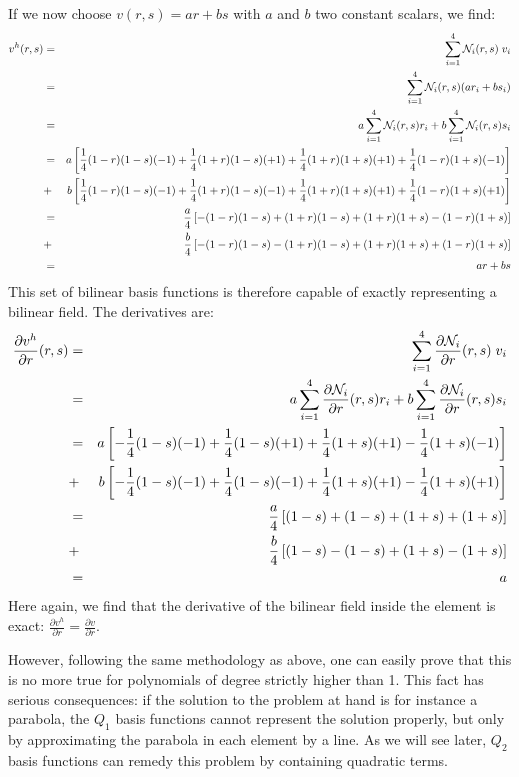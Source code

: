 If we now choose $v(r,s)=ar+bs$ with $a$ and $b$ two constant scalars, we find:
\begin{eqnarray}
v^h(r,s) 
&=& \sum_{i=1}^4 {\mathcal{N}}_i(r,s)\;  v_i  \nonumber\\
&=& \sum_{i=1}^4 {\mathcal{N}}_i(r,s) (ar_i+bs_i) \nonumber\\
&=& a \sum_{i=1}^4 {\mathcal{N}}_i(r,s) r_i + b \sum_{i=1}^4 {\mathcal{N}}_i(r,s) s_i \nonumber\\
&=& a \left[ 
 \frac14(1-r)(1-s)(-1)
+\frac14(1+r)(1-s)(+1)
+\frac14(1+r)(1+s)(+1)
+\frac14(1-r)(1+s)(-1) \right]  \nonumber\\
&+& b  
\left[ 
 \frac14(1-r)(1-s)(-1)
+\frac14(1+r)(1-s)(-1)
+\frac14(1+r)(1+s)(+1)
+\frac14(1-r)(1+s)(+1) \right]  \nonumber\\
&=& \frac{a}{4} \left[ 
-(1-r)(1-s)
+(1+r)(1-s)
+(1+r)(1+s)
-(1-r)(1+s) \right]  \nonumber\\
&+& \frac{b}{4}
\left[ 
-(1-r)(1-s)
-(1+r)(1-s)
+(1+r)(1+s)
+(1-r)(1+s) 
\right]  \nonumber\\
&=& ar+bs
\end{eqnarray}
This set of bilinear basis functions is therefore capable of exactly representing a bilinear field.
The derivatives are:
\begin{eqnarray}
\frac{\partial v^h}{\partial r}(r,s) 
&=& \sum_{i=1}^4 \frac{\partial {\mathcal{N}}_i}{\partial r}(r,s)\;  v_i  \nonumber\\
&=& a \sum_{i=1}^4 \frac{\partial {\mathcal{N}}_i}{\partial r}(r,s) r_i 
+ b \sum_{i=1}^4 \frac{\partial {\mathcal{N}}_i}{\partial r}(r,s) s_i \nonumber\\
&=& a \left[
- \frac14(1-s)(-1) 
+ \frac14(1-s)(+1) 
+ \frac14(1+s)(+1) 
- \frac14(1+s)(-1) 
\right] \nonumber\\
&+&b \left[
- \frac14(1-s)(-1) 
+ \frac14(1-s)(-1) 
+ \frac14(1+s)(+1) 
- \frac14(1+s)(+1) 
\right] \nonumber\\
&=& \frac{a}{4} \left[
 (1-s)
+ (1-s)
+ (1+s)
+ (1+s)
\right] \nonumber\\
&+&\frac{b}{4} \left[
 (1-s)
- (1-s)
+ (1+s)
- (1+s)
\right] \nonumber\\
&=& a 
\end{eqnarray}
Here again, we find that the derivative of the bilinear field inside the element is exact: 
$\frac{\partial v^h}{\partial r} = \frac{\partial v}{\partial r}$.

However, following the same methodology as above, one can easily prove 
that this is no more true for polynomials of degree strictly higher than 1. 
This fact has serious consequences: if the solution to the problem at hand is 
for instance a parabola, the $Q_1$ basis functions cannot represent the solution properly, 
but only by approximating the parabola in each element by a line. As we will see 
later, $Q_2$ basis functions can remedy this problem by containing quadratic terms.

